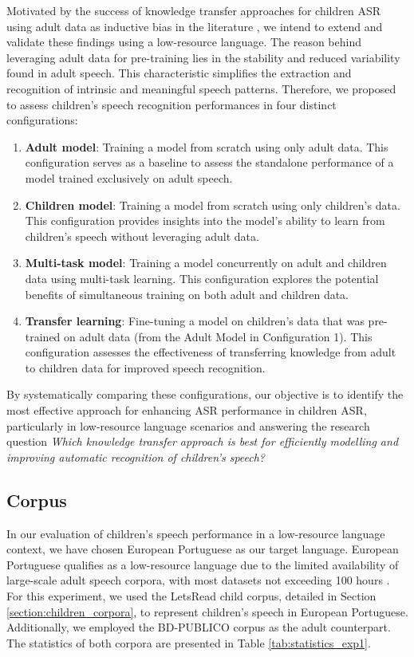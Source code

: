 Motivated by the success of knowledge transfer approaches for children \ac{ASR} using adult data as inductive bias in the literature \cite{TFchildren,TransferLF,2019multi}, we intend to extend and validate these findings using a low-resource language. The reason behind leveraging adult data for pre-training lies in the stability and reduced variability found in adult speech. This characteristic simplifies the extraction and recognition of intrinsic and meaningful speech patterns.
Therefore, we proposed to assess children's speech recognition performances in four distinct configurations:
\begin{enumerate}
    \item \textbf{Adult model}: Training a model from scratch using only adult data. This configuration serves as a baseline to assess the standalone performance of a model trained exclusively on adult speech.
    \item \textbf{Children model}: Training a model from scratch using only children's data. This configuration provides insights into the model's ability to learn from children's speech without leveraging adult data.
    \item \textbf{Multi-task model}: Training a model concurrently on adult and children data using multi-task learning. This configuration explores the potential benefits of simultaneous training on both adult and children data.
    \item \textbf{Transfer learning}: Fine-tuning a model on children's data that was pre-trained on adult data (from the Adult Model in Configuration 1). This configuration assesses the effectiveness of transferring knowledge from adult to children data for improved speech recognition.
\end{enumerate}

By systematically comparing these configurations, our objective is to identify the most effective approach for enhancing \ac{ASR} performance in children \ac{ASR}, particularly in low-resource language scenarios and answering the research question  \textit{Which knowledge transfer approach is best for efficiently modelling and improving automatic recognition of children's speech?} 


\subsection{Corpus}
\label{sec:corpus}
In our evaluation of children's speech performance in a low-resource language context, we have chosen European Portuguese as our target language. European Portuguese qualifies as a low-resource language due to the limited availability of large-scale adult speech corpora, with most datasets not exceeding 100 hours \cite{tribus}. For this experiment, we used the LetsRead child corpus, detailed in Section \ref{section:children_corpora}, to represent children's speech in European Portuguese. Additionally, we employed the BD-PUBLICO corpus as the adult counterpart. The statistics of both corpora are presented in Table \ref{tab:statistics_exp1}.

